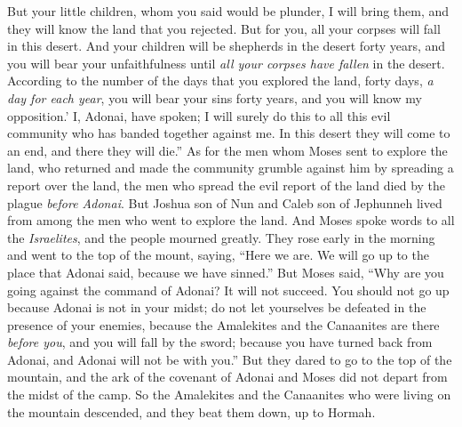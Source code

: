 \begin{biblechapter}
\verse But your little children, whom you said would be plunder, I will bring them, and they will know the land that you rejected.
\verse But for you, all your corpses will fall in this desert.
\verse And your children will be shepherds in the desert forty years, and you will bear your unfaithfulness until \textit{all your corpses have fallen} in the desert.
\verse According to the number of the days that you explored the land, forty days, \textit{a day for each year}, you will bear your sins forty years, and you will know my opposition.’
\verse I, Adonai, have spoken; I will surely do this to all this evil community who has banded together against me. In this desert they will come to an end, and there they will die.”
\verse As for the men whom Moses sent to explore the land, who returned and made the community grumble against him by spreading a report over the land,
\verse the men who spread the evil report of the land died by the plague \textit{before Adonai}.
\verse But Joshua son of Nun and Caleb son of Jephunneh lived from among the men who went to explore the land.
\verse And Moses spoke words to all the \textit{Israelites}, and the people mourned greatly.
\verse They rose early in the morning and went to the top of the mount, saying, “Here we are. We will go up to the place that Adonai said, because we have sinned.”
\verse But Moses said, “Why are you going against the command of Adonai? It will not succeed.
\verse You should not go up because Adonai is not in your midst; do not let yourselves be defeated in the presence of your enemies,
\verse because the Amalekites and the Canaanites are there \textit{before you}, and you will fall by the sword; because you have turned back from Adonai, and Adonai will not be with you.”
\verse But they dared to go to the top of the mountain, and the ark of the covenant of Adonai and Moses did not depart from the midst of the camp.
\verse So the Amalekites and the Canaanites who were living on the mountain descended, and they beat them down, up to Hormah.
\end{biblechapter}

